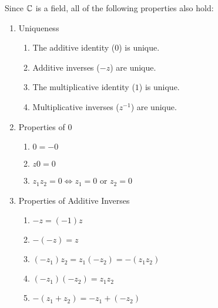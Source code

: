 \documentclass[letterpaper,12pt,fleqn]{article}
\begin{document}
Since $\mathbb{C}$ is a field, all of the following properties also hold:
\begin{enumerate}
\item Uniqueness
\begin{enumerate}
\item The additive identity ($0$) is unique.
\item Additive inverses ($-z$) are unique.
\item The multiplicative identity ($1$) is unique.
\item Multiplicative inverses ($z^{-1}$) are unique.
\end{enumerate}
\newpage
\item Properties of 0
\begin{enumerate}
\item $0=-0$
\item $z0=0$
\item $z_1z_2=0\iff z_1=0$ or $z_2=0$
\end{enumerate}
\item Properties of Additive Inverses
\begin{enumerate}
\item $-z=(-1)z$
\item $-(-z)=z$
\item $(-z_1)z_2=z_1(-z_2)=-(z_1z_2)$
\item $(-z_1)(-z_2)=z_1z_2$
\item $-(z_1+z_2)=-z_1+(-z_2)$
\end{enumerate}
\end{enumerate}
\end{document}
